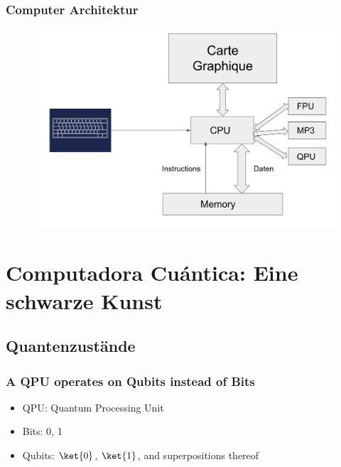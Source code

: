 \documentclass{beamer}
\begin{document}
\begin{frame}
\frametitle{Computer Architektur}
\begin{figure}
\centering
\includegraphics[width=\textwidth]{qpu.png}
\label{qpu}
\end{figure}
\end{frame}

\section{Computadora Cu\'antica: Eine schwarze Kunst}

\subsection{Quantenzust\"ande}

\begin{frame}
\frametitle{A QPU operates on Qubits instead of Bits}
\begin{itemize}
	\item QPU: Quantum Processing Unit
	\item Bits: 0, 1
	\item Qubits: $\ket{0}$, $\ket{1}$, and superpositions thereof
\end{itemize}
\end{frame}
\end{document}
